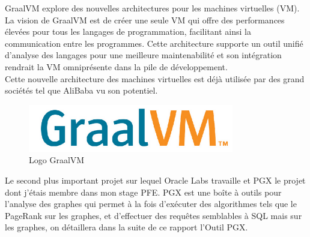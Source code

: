 GraalVM explore des nouvelles architectures pour les machines virtuelles (VM). La vision de GraalVM est de créer une seule VM qui offre des performances élevées pour tous les langages de programmation, facilitant ainsi la communication entre les programmes. Cette architecture supporte un outil unifié d'analyse des langages pour une meilleure maintenabilité et son intégration rendrait la VM omniprésente dans la pile de développement.\\

Cette nouvelle architecture des machines virtuelles est déjà utilisée par des grand sociétés tel que AliBaba vu son potentiel.\\

\begin{figure}[h!]  
  \centering
    \includegraphics[width=0.8\textwidth]{chapitre1/Figures/GraalVM.png}
  \caption{Logo GraalVM}
\end{figure}

Le second plus important projet sur lequel Oracle Labs travaille et PGX le projet dont j’étais membre dans mon stage PFE. PGX est une boîte à outils pour l'analyse des graphes qui permet à la fois d'exécuter des algorithmes tels que le PageRank sur les graphes, et d'effectuer des requêtes semblables à SQL mais sur les graphes, on détaillera dans la suite de ce rapport l’Outil PGX.